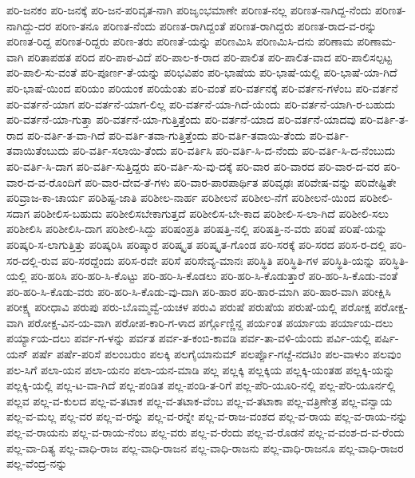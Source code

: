 ಪರಿ-ಜನಕಂ
ಪರಿ-ಜನಕ್ಕೆ
ಪರಿ-ಜನ-ಪರಿವೃತ-ನಾಗಿ
ಪರಿಜೃಂಭಮಾಣೇ
ಪರಿಣತ-ನಲ್ಲ
ಪರಿಣತ-ನಾಗಿದ್ದ-ನೆಂದು
ಪರಿಣತ-ನಾಗಿದ್ದು-ದರ
ಪರಿಣ-ತನೂ
ಪರಿಣತ-ನೆಂದು
ಪರಿಣತ-ರಾಗಿದ್ದಂತೆ
ಪರಿಣತ-ರಾಗಿದ್ದರು
ಪರಿಣತ-ರಾದ-ವ-ರನ್ನು
ಪರಿಣತ-ರಿದ್ದ
ಪರಿಣತ-ರಿದ್ದರು
ಪರಿಣ-ತರು
ಪರಿಣತೆ-ಯನ್ನು
ಪರಿಣಮಿಸಿ
ಪರಿಣಮಿಸಿ-ದನು
ಪರಿಣಾಮ
ಪರಿಣಾಮ-ವಾಗಿ
ಪರಿತಾಪಹತ
ಪರಿದ
ಪರಿ-ಪಾಠ-ವಿದೆ
ಪರಿ-ಪಾಲ-ಕ-ರಾದ
ಪರಿ-ಪಾಲಿತ
ಪರಿ-ಪಾಲಿತ-ವಾದ
ಪರಿ-ಪಾಲಿಸಲ್ಪಟ್ಟ
ಪರಿ-ಪಾಲಿ-ಸು-ವಂತೆ
ಪರಿ-ಪೂರ್ಣ-ತೆ-ಯನ್ನು
ಪರಿಭವಿಪಂ
ಪರಿ-ಭಾಷೆಯ
ಪರಿ-ಭಾಷೆ-ಯಲ್ಲಿ
ಪರಿ-ಭಾಷೆ-ಯಾ-ಗಿದೆ
ಪರಿ-ಭಾಷೆ-ಯಿಂದ
ಪರಿಯಂ
ಪರಿಯಂಕ
ಪರಿಯೆಂತು
ಪರಿ-ವಂತೆ
ಪರಿ-ವರ್ತನಕ್ಕೆ
ಪರಿ-ವರ್ತನ-ಗಳೆಂಬ
ಪರಿ-ವರ್ತನೆ
ಪರಿ-ವರ್ತನೆ-ಯಾಗ
ಪರಿ-ವರ್ತನೆ-ಯಾಗ-ಲಿಲ್ಲ
ಪರಿ-ವರ್ತನೆ-ಯಾ-ಗಿದೆ-ಯೆಂದು
ಪರಿ-ವರ್ತನೆ-ಯಾಗಿ-ರ-ಬಹುದು
ಪರಿ-ವರ್ತನೆ-ಯಾ-ಗುತ್ತಾ
ಪರಿ-ವರ್ತನೆ-ಯಾ-ಗುತ್ತಿತ್ತೆಂದು
ಪರಿ-ವರ್ತನೆ-ಯಾದ
ಪರಿ-ವರ್ತನೆ-ಯಾದವು
ಪರಿ-ವರ್ತಿ-ತ-ರಾದ
ಪರಿ-ವರ್ತಿ-ತ-ವಾ-ಗಿದೆ
ಪರಿ-ವರ್ತಿ-ತವಾ-ಗುತ್ತಿತ್ತೆಂದು
ಪರಿ-ವರ್ತಿ-ತವಾಯಿ-ತೆಂದು
ಪರಿ-ವರ್ತಿ-ತವಾಯಿತೆಂಬುದು
ಪರಿ-ವರ್ತಿ-ಸಲಾಯಿ-ತೆಂದು
ಪರಿ-ವರ್ತಿಸಿ
ಪರಿ-ವರ್ತಿ-ಸಿ-ದ-ನೆಂದು
ಪರಿ-ವರ್ತಿ-ಸಿ-ದ-ನೆಂಬುದು
ಪರಿ-ವರ್ತಿ-ಸಿ-ದಾಗ
ಪರಿ-ವರ್ತಿ-ಸುತ್ತಿದ್ದರು
ಪರಿ-ವರ್ತಿ-ಸು-ವು-ದಕ್ಕೆ
ಪರಿ-ವಾರ
ಪರಿ-ವಾರದ
ಪರಿ-ವಾರ-ದ-ವರ
ಪರಿ-ವಾರ-ದ-ವ-ರೊಂದಿಗೆ
ಪರಿ-ವಾರ-ದೇವ-ತೆ-ಗಳು
ಪರಿ-ವಾರ-ಪಾರಪಾರ್ಥಿತ
ಪರಿವೃಢಃ
ಪರಿವೇಷ-ವನ್ನು
ಪರಿವೇಷ್ಟಿತೇ
ಪರಿವ್ರಾಜ-ಕಾ-ಚಾರ್ಯ
ಪರಿಶಿಷ್ಟ-ಜಾತಿ
ಪರಿಶೀಲ-ನಾರ್ಹ
ಪರಿಶೀಲನೆ
ಪರಿಶೀಲ-ನೆಗೆ
ಪರಿಶೀಲನೆ-ಯಿಂದ
ಪರಿಶೀಲಿ-ಸದಾಗ
ಪರಿಶೀಲಿಸ-ಬಹುದು
ಪರಿಶೀಲಿಸಬೇಕಾಗುತ್ತದೆ
ಪರಿಶೀಲಿಸ-ಬೇ-ಕಾದ
ಪರಿಶೀಲಿ-ಸ-ಲಾ-ಗಿದೆ
ಪರಿಶೀಲಿ-ಸಲು
ಪರಿಶೀಲಿಸಿ
ಪರಿಶೀಲಿಸಿ-ದಾಗ
ಪರಿಶೀಲಿ-ಸಿದ್ದು
ಪರಿಷಂಪ್ರತಿ
ಪರಿಷತ್ತಿ-ನಲ್ಲಿ
ಪರಿಷತ್ತಿ-ನ-ವರು
ಪರಿಷೆ
ಪರಿಷೆ-ಯನ್ನು
ಪರಿಷ್ಕರಿ-ಸ-ಲಾಗುತ್ತಿತ್ತು
ಪರಿಷ್ಕರಿಸಿ
ಪರಿಷ್ಕಾರ
ಪರಿಷ್ಕೃತ
ಪರಿಷ್ಕೃತ-ಗೊಂಡ
ಪರಿ-ಸರಕ್ಕೆ
ಪರಿ-ಸರದ
ಪರಿಸ-ರ-ದಲ್ಲಿ
ಪರಿ-ಸರ-ದಲ್ಲಿ-ರುವ
ಪರಿ-ಸರದ್ದೆಂದು
ಪರಿಸ-ರವೇ
ಪರಿಸೆ
ಪರಿಸೇವ್ಯ-ಮಾನಃ
ಪರಿಸ್ಥಿತಿ
ಪರಿಸ್ಥಿತಿ-ಗಳ
ಪರಿಸ್ಥಿತಿ-ಯನ್ನು
ಪರಿಸ್ಥಿತಿ-ಯಲ್ಲಿ
ಪರಿ-ಹರಿಸಿ
ಪರಿ-ಹರಿ-ಸಿ-ಕೊಟ್ಟು
ಪರಿ-ಹರಿ-ಸಿ-ಕೊಡಲು
ಪರಿ-ಹರಿ-ಸಿ-ಕೊಡುತ್ತಾರೆ
ಪರಿ-ಹರಿ-ಸಿ-ಕೊಡು-ವಂತೆ
ಪರಿ-ಹರಿ-ಸಿ-ಕೊಡು-ವರು
ಪರಿ-ಹರಿ-ಸಿ-ಕೊಡು-ವು-ದಾಗಿ
ಪರಿ-ಹಾರ
ಪರಿ-ಹಾರ-ಮಾಗಿ
ಪರಿ-ಹಾರ-ವಾಗಿ
ಪರೀಕ್ಷಿಸಿ
ಪರೀಕ್ಷ್ಯ
ಪರೀಧಾವಿ
ಪರುಪು
ಪರು-ಬೊಮ್ಮವ್ವೆ-ಯಚಳ
ಪರುವಿ
ಪರುಷೆ
ಪರುಷೆಯ
ಪರುಷೆ-ಯಲ್ಲಿ
ಪರೋಕ್ಷ
ಪರೋಕ್ಷ-ವಾಗಿ
ಪರೋಕ್ಷ-ವಿನ-ಯ-ವಾಗಿ
ಪರೋಪ-ಕಾರಿ-ಗ-ಳಾದ
ಪರ್ಗ್ಗೊಣ್ಣಿನ್ದ
ಪರ್ಯಂತ
ಪರ್ಯಾಯ
ಪರ್ಯಾಯ-ದಲು
ಪರ್ಯ್ಯಾಯ-ದಲು
ಪರ್ವ-ಗ-ಳನ್ನು
ಪರ್ವತ
ಪರ್ವ-ತ-ಕಂಬಿ-ಕಾವಡಿ
ಪರ್ವ-ತಾ-ವಳಿ-ಯೆಂದು
ಪರ್ವಿ-ಯಲ್ಲಿ
ಪರ್ಷಿ-ಯನ್
ಪರ್ಷೆ
ಪರ್ಷೆ-ಪರಿಸೆ
ಪಲಂಬರುಂ
ಪಲಕ್ಕಿ
ಪಲಗೈಯಾನುಮ್
ಪಲರ್ಪ್ಪೊ-ಗೞ್ದೆ-ನದಟಿಂ
ಪಲ-ವಾಳುಂ
ಪಲವುಂ
ಪಲ-ಸಿಗೆ
ಪಲಾ-ಯನ
ಪಲಾ-ಯನಂ
ಪಲಾ-ಯನ-ಮಾಡಿ
ಪಲ್ಲ
ಪಲ್ಲಕ್ಕಿ
ಪಲ್ಲಕ್ಕಿಯ
ಪಲ್ಲಕ್ಕಿ-ಯಂತಹ
ಪಲ್ಲಕ್ಕಿ-ಯನ್ನು
ಪಲ್ಲಕ್ಕಿ-ಯಲ್ಲಿ
ಪಲ್ಲ-ಟ-ವಾ-ಗಿದೆ
ಪಲ್ಲ-ಪಂಡಿತ
ಪಲ್ಲ-ಪಂಡಿ-ತ-ರಿಗೆ
ಪಲ್ಲ-ಪೆರಿ-ಯೂರಿ-ನಲ್ಲಿ
ಪಲ್ಲ-ಪೆರಿ-ಯೂರ್ನಲ್ಲಿ
ಪಲ್ಲವ
ಪಲ್ಲ-ವ-ಕುಲದ
ಪಲ್ಲ-ವ-ತಟಾಕ
ಪಲ್ಲ-ವ-ತಟಾಕ-ವೆಂಬ
ಪಲ್ಲ-ವ-ತಟಾಕಾ
ಪಲ್ಲ-ವತ್ರಿಣೇತ್ರ
ಪಲ್ಲ-ವನ್ವಾಯ
ಪಲ್ಲ-ವ-ಮಲ್ಲ
ಪಲ್ಲ-ವರ
ಪಲ್ಲ-ವ-ರನ್ನು
ಪಲ್ಲ-ವ-ರನ್ನೇ
ಪಲ್ಲ-ವ-ರಾಜ-ವಂಶದ
ಪಲ್ಲ-ವ-ರಾಯ
ಪಲ್ಲ-ವ-ರಾಯ-ನನ್ನು
ಪಲ್ಲ-ವ-ರಾಯನು
ಪಲ್ಲ-ವ-ರಾಯ-ನೆಂಬ
ಪಲ್ಲ-ವರು
ಪಲ್ಲ-ವ-ರೆಂದು
ಪಲ್ಲ-ವ-ರೊಡನೆ
ಪಲ್ಲ-ವ-ವಂಶ-ದ-ವ-ರೆಂದು
ಪಲ್ಲ-ವಾ-ದಿತ್ಯ
ಪಲ್ಲ-ವಾಧಿ-ರಾಜ
ಪಲ್ಲ-ವಾಧಿ-ರಾಜನ
ಪಲ್ಲ-ವಾಧಿ-ರಾಜನು
ಪಲ್ಲ-ವಾಧಿ-ರಾಜನೂ
ಪಲ್ಲ-ವಾಧಿ-ರಾಜರ
ಪಲ್ಲ-ವೆಂದ್ರ-ನನ್ನು
